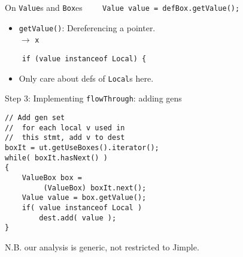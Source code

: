 \begin{slide}{On {\tt Value}s and {\tt Box}es}
{\red \verb+    Value value = defBox.getValue();+}

\begin{itemize}
\item {\tt getValue()}: Dereferencing a pointer.\\
\qquad \qquad \qquad \qquad {} $\to$ {\tt x}
\end{itemize}

{\red \verb+    if (value instanceof Local) {+}

\begin{itemize}
\item Only care about defs of {\tt Local}s here.
\end{itemize}
\end{slide}

\begin{slide}{Step 3: Implementing {\tt flowThrough}: adding gens}
\vspace*{-0.1in}
\begin{verbatim}
// Add gen set
//  for each local v used in 
//  this stmt, add v to dest
boxIt = ut.getUseBoxes().iterator();
while( boxIt.hasNext() ) 
{
    ValueBox box = 
         (ValueBox) boxIt.next();
    Value value = box.getValue();
    if( value instanceof Local )
        dest.add( value );
}
\end{verbatim}

N.B. our analysis is generic, not restricted to Jimple.
\end{slide}

